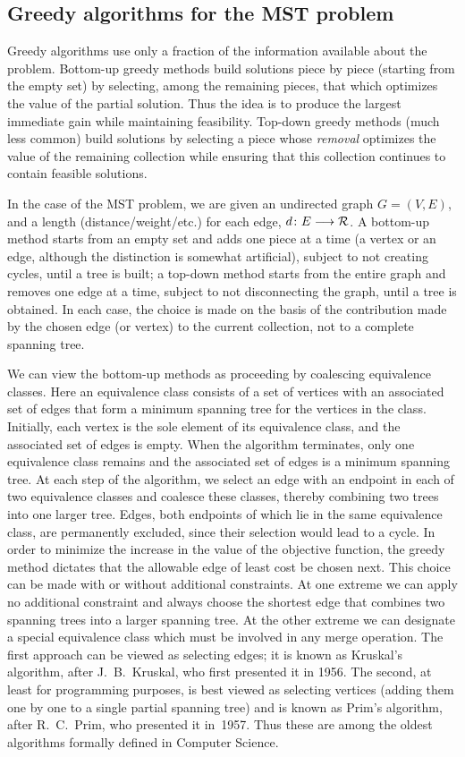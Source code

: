 \documentclass[11pt]{article}
\begin{document}
\subsection{Greedy algorithms for the MST problem}
Greedy algorithms use only a fraction of the information available about
the problem. Bottom-up greedy methods build solutions piece by piece (starting
from the empty set) by selecting, among the
remaining pieces, that which optimizes the value of the partial solution.
Thus the idea is to produce the largest immediate gain while maintaining
feasibility.
Top-down greedy methods (much less common) build solutions by selecting
a piece whose \emph{removal} optimizes the value of the remaining collection
while ensuring that this collection continues to contain feasible solutions.

In the case of the MST problem, we are given an undirected graph
$G=(V,E)$, and a length (distance/weight/etc.) for each edge,
$d\colon E\longrightarrow {\cal R}$.   A bottom-up method starts from
an empty set and adds one piece at a time (a vertex or an edge, although
the distinction is somewhat artificial), subject to not creating cycles,
until a tree is built; a top-down method starts from the entire graph and
removes one edge at a time, subject to not disconnecting the graph, until
a tree is obtained.  In each case, the choice is made on the basis of the
contribution made by the chosen edge (or vertex) to the current collection,
not to a complete spanning tree.

We can view the bottom-up methods as proceeding by coalescing equivalence
classes.  Here an equivalence class consists of a set of vertices with an
associated set of edges that form a minimum spanning tree for the vertices in
the class.  Initially, each vertex is the sole element of its equivalence
class, and the associated set of edges is empty.  When the algorithm
terminates, only one equivalence class remains and the associated set of edges
is a minimum spanning tree.  At each step of the algorithm, we select an edge
with an endpoint in each of two equivalence classes and coalesce these classes,
thereby combining two trees into one larger tree.  Edges, both endpoints of
which lie in the same equivalence class, are permanently excluded, since their
selection would lead to a cycle.  In order to minimize the increase in the
value of the objective function, the greedy method dictates that the allowable
edge of least cost be chosen next.  This choice can be made with or without
additional constraints.  At one extreme we can apply no additional constraint
and always choose the shortest edge that combines two spanning trees into a
larger spanning tree.  At the other extreme we can designate a special
equivalence class which must be involved in any merge operation.  The first
approach can be viewed as selecting edges; it is known as Kruskal's algorithm,
after J.~B.~Kruskal, who first presented it in 1956.  The second, at least for
programming purposes, is best viewed as selecting vertices (adding them one by
one to a single partial spanning tree) and is known as Prim's algorithm, after
R.~C.~Prim, who presented it in~1957.  Thus these are among the oldest
algorithms formally defined in Computer Science.
\end{document}
